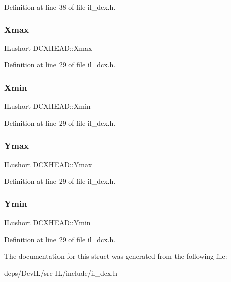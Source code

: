 Definition at line 38 of file il\+\_\+dcx.\+h.

\mbox{\label{structDCXHEAD_ad8ffd59eeb25f10abaa4b1ae2c508a71}} 
\subsubsection{\texorpdfstring{Xmax}{Xmax}}
{\footnotesize\ttfamily I\+Lushort D\+C\+X\+H\+E\+A\+D\+::\+Xmax}



Definition at line 29 of file il\+\_\+dcx.\+h.

\mbox{\label{structDCXHEAD_a1c69b47f737e16362a9c52969c5a51ed}} 
\subsubsection{\texorpdfstring{Xmin}{Xmin}}
{\footnotesize\ttfamily I\+Lushort D\+C\+X\+H\+E\+A\+D\+::\+Xmin}



Definition at line 29 of file il\+\_\+dcx.\+h.

\mbox{\label{structDCXHEAD_a456b56d6e8c67f14a7120ab2835a0b86}} 
\subsubsection{\texorpdfstring{Ymax}{Ymax}}
{\footnotesize\ttfamily I\+Lushort D\+C\+X\+H\+E\+A\+D\+::\+Ymax}



Definition at line 29 of file il\+\_\+dcx.\+h.

\mbox{\label{structDCXHEAD_a1afa144ca86ed7ab2c3e7afe53d968c1}} 
\subsubsection{\texorpdfstring{Ymin}{Ymin}}
{\footnotesize\ttfamily I\+Lushort D\+C\+X\+H\+E\+A\+D\+::\+Ymin}



Definition at line 29 of file il\+\_\+dcx.\+h.



The documentation for this struct was generated from the following file\+:\begin{DoxyCompactItemize}
\item 
deps/\+Dev\+I\+L/src-\/\+I\+L/include/il\+\_\+dcx.\+h\end{DoxyCompactItemize}
